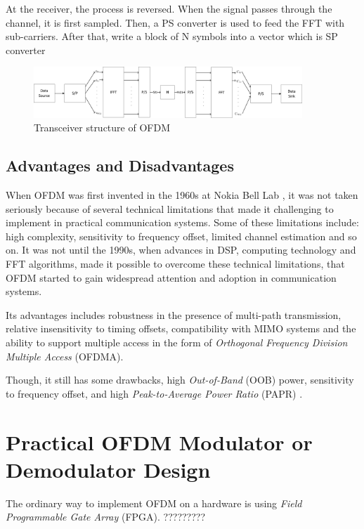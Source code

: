 \documentclass{article}
\numberwithin{figure}{section}
\numberwithin{equation}{section}
\begin{document}
At the receiver, the process is reversed. When the signal passes through the channel, it is first sampled. Then, a PS converter is used to feed the FFT with sub-carriers. After that, write a block of N symbols into a vector which is SP converter

\begin{figure}[!ht]
  \centering
  \includegraphics[width=0.9\textwidth]{images/OFDM_transceiver.pdf}
  \caption{Transceiver structure of OFDM}
  \label{fig:env}
\end{figure}

\subsection{Advantages and Disadvantages}
When OFDM was first invented in the 1960s at Nokia Bell Lab \cite{RN82}, it was not taken seriously because of several technical limitations that made it challenging to implement in practical communication systems. Some of these limitations include: high complexity, sensitivity to frequency offset, limited channel estimation and so on. It was not until the 1990s, when advances in DSP, computing technology and FFT algorithms, made it possible to overcome these technical limitations, that OFDM started to gain widespread attention and adoption in communication systems. 

Its advantages includes robustness in the presence of multi-path transmission, relative insensitivity to timing offsets, compatibility with MIMO systems and the ability to support multiple access in the form of \textit{Orthogonal Frequency Division Multiple Access} (OFDMA). 

Though, it still has some drawbacks, high \textit{Out-of-Band} (OOB) power, sensitivity to frequency offset, and high \textit{Peak-to-Average Power Ratio} (PAPR) \cite{RN81}.

\section{Practical OFDM Modulator or Demodulator Design}
The ordinary way to implement OFDM on a hardware is using \textit{Field Programmable Gate Array} (FPGA).
?????????


\end{document}

